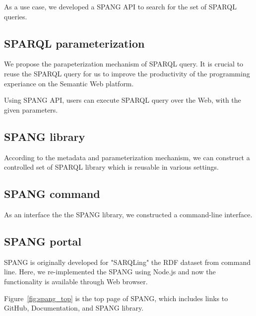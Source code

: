 \documentclass[runningheads]{llncs}
\begin{document}
As a use case, we developed a SPANG API to search for the set of SPARQL queries.

\subsection{SPARQL parameterization}

We propose the parapeterization mechanism of SPARQL query. It is crucial to reuse the SPARQL query for us to improve the productivity of the programming experiance on the Semantic Web platform.

Using SPANG API, users can execute SPARQL query over the Web, with the given parameters.

\subsection{SPANG library}

According to the metadata and parameterization mechanism, we can construct a controlled set of SPARQL library which is reusable in various settings.

\subsection{SPANG command}

As an interface the the SPANG library, we constructed a command-line interface.

\subsection{SPANG portal}
SPANG is originally developed for "SARQLing" the RDF dataset from command line. Here, we re-implemented the SPANG using Node.js and now the functionality is available through Web browser. 

Figure~\ref{fig:spang_top} is the top page of SPANG, which includes links to GitHub, Documentation, and SPANG library.
\end{document}
